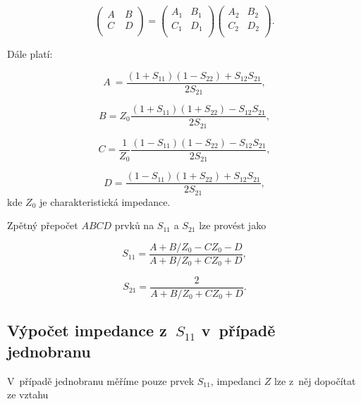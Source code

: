 \documentclass{protokol}
\newcommand\sparam{S}
\newcommand\impedance{Z}
\begin{document}
\[
\begin{pmatrix}
	A~& B  \\
	C &	D  \\
\end{pmatrix}
=
\begin{pmatrix}
	A_1 & B_1  \\
	C_1 & D_1  \\
\end{pmatrix}
%
\begin{pmatrix}
	A_2 & B_2  \\
	C_2 & D_2  \\
\end{pmatrix}
.\]

Dále platí:

\begin{equation}
	A~= \frac{(1+S_{11})(1-S_{22})+S_{12}S_{21}}{2S_{21}},
	\label{eq:A}
\end{equation}

\begin{equation}
	B = Z_0 \frac{(1+S_{11})(1+S_{22})-S_{12}S_{21}}{2S_{21}},
	\label{eq:B}
\end{equation}

\begin{equation}
	C = \frac{1}{Z_0} \frac{(1-S_{11})(1-S_{22})-S_{12}S_{21}}{2S_{21}},
	\label{eq:C}
\end{equation}

\begin{equation}
	D = \frac{(1-S_{11})(1+S_{22})+S_{12}S_{21}}{2S_{21}},
	\label{eq:D}
\end{equation}
kde $\impedance_{0}$ je charakteristická impedance.

Zpětný přepočet $ABCD$ prvků na $S_{11}$ a $S_{21}$ lze provést jako

\begin{equation}
	S_{11} = \frac{A+B/Z_0-CZ_0-D}{A+B/Z_0+CZ_0+D},
	\label{eq:s11}
\end{equation}

\begin{equation}
	S_{21} = \frac{2}{A+B/Z_0+CZ_0+D}.
	\label{eq:s21}
\end{equation}

\subsection{Výpočet impedance z~$\sparam_{11}$ v~případě jednobranu}
V~případě jednobranu měříme pouze prvek $\sparam_{11}$, impedanci $\impedance$ 
lze z~něj dopočítat ze vztahu
\end{document}
